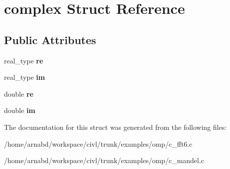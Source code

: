 \hypertarget{structcomplex}{}\section{complex Struct Reference}
\label{structcomplex}
\subsection*{Public Attributes}
\begin{DoxyCompactItemize}
\item 
\hypertarget{structcomplex_abb4ae663ece6cc9cbecea19d240bafbe}{}real\+\_\+type {\bfseries re}\label{structcomplex_abb4ae663ece6cc9cbecea19d240bafbe}

\item 
\hypertarget{structcomplex_a0dc1ac83984fb7b033e88b767633a7ea}{}real\+\_\+type {\bfseries im}\label{structcomplex_a0dc1ac83984fb7b033e88b767633a7ea}

\item 
\hypertarget{structcomplex_a89c5abf606f901c8fdc3ff4a75a5c481}{}double {\bfseries re}\label{structcomplex_a89c5abf606f901c8fdc3ff4a75a5c481}

\item 
\hypertarget{structcomplex_abf4f2edf3802189a09e78b6f3a50494f}{}double {\bfseries im}\label{structcomplex_abf4f2edf3802189a09e78b6f3a50494f}

\end{DoxyCompactItemize}


The documentation for this struct was generated from the following files\+:\begin{DoxyCompactItemize}
\item 
/home/arnabd/workspace/civl/trunk/examples/omp/c\+\_\+fft6.\+c\item 
/home/arnabd/workspace/civl/trunk/examples/omp/c\+\_\+mandel.\+c\end{DoxyCompactItemize}
